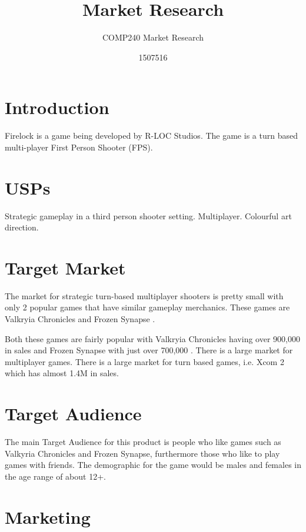 \documentclass{scrartcl}
\title{Market Research}
\subtitle{COMP240 Market Research}
\author{1507516}
\begin{document}
\maketitle


\section{Introduction}
Firelock is a game being developed by R-LOC Studios. The game is a turn based multi-player First Person Shooter (FPS).

\section{USPs}
Strategic gameplay in a third person shooter setting.
Multiplayer.
Colourful art direction.

\section{Target Market}
The market for strategic turn-based multiplayer shooters is pretty small with only 2 popular games that have similar gameplay merchanics.
These games are Valkryia Chronicles and Frozen Synapse \cite{Valkyria, Frozen}.

 Both these games are fairly popular with Valkryia Chronicles having over 900,000\cite{Valkyria} in sales and Frozen Synapse with just over 700,000 \cite{Frozen}.
There is a large market for multiplayer games.
There is a large market for turn based games, i.e. Xcom 2\cite{xcom} which has almost 1.4M in sales. 

\section{Target Audience}
The main Target Audience for this product is people who like games such as Valkyria Chronicles and Frozen Synapse, furthermore those who like to play games with friends.
The demographic for the game would be males and females in the age range of about 12+.


\section{Marketing}







\end{document}
